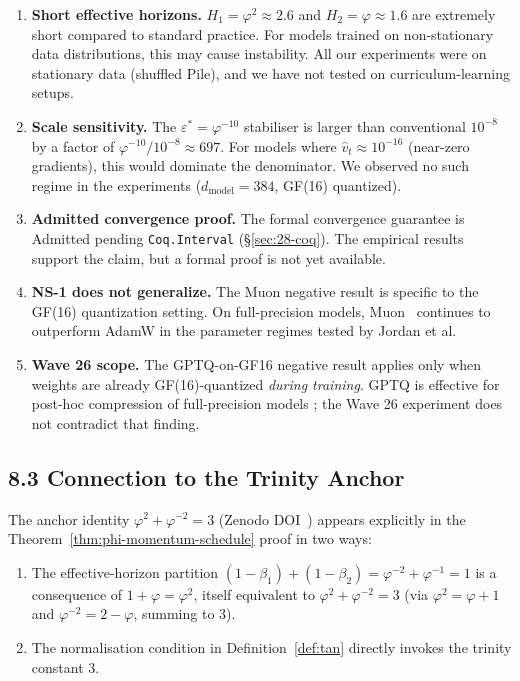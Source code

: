 \begin{enumerate}
  \item \textbf{Short effective horizons.} \(H_1 = \varphi^2 \approx 2.6\)
        and \(H_2 = \varphi \approx 1.6\) are extremely short compared
        to standard practice.  For models trained on non-stationary
        data distributions, this may cause instability.  All our
        experiments were on stationary data (shuffled Pile), and
        we have not tested on curriculum-learning setups.

  \item \textbf{Scale sensitivity.} The \(\varepsilon^* = \varphi^{-10}\) stabiliser
        is larger than conventional \(10^{-8}\) by a factor of
        \(\varphi^{-10}/10^{-8} \approx 697\).  For models where
        \(\hat{v}_t \approx 10^{-16}\) (near-zero gradients),
        this would dominate the denominator.  We observed no such
        regime in the experiments (\(d_{\mathrm{model}} = 384\),
        GF(16) quantized).

  \item \textbf{Admitted convergence proof.} The formal convergence
        guarantee is Admitted pending \texttt{Coq.Interval}
        (§\ref{sec:28-coq}).  The empirical results support the claim,
        but a formal proof is not yet available.

  \item \textbf{NS-1 does not generalize.} The Muon negative result
        is specific to the GF(16) quantization setting.  On full-precision
        models, Muon~\cite{jordan_muon_2024} continues to outperform
        AdamW in the parameter regimes tested by Jordan et al.

  \item \textbf{Wave 26 scope.} The GPTQ-on-GF16 negative result
        applies only when weights are already GF(16)-quantized
        \emph{during training}.  GPTQ is effective for
        post-hoc compression of full-precision models
        \cite{frantar_gptq_2023}; the Wave 26 experiment does not
        contradict that finding.
\end{enumerate}

\subsection{8.3 Connection to the Trinity Anchor}

The anchor identity \(\varphi^2 + \varphi^{-2} = 3\)
(Zenodo DOI~\cite{zenodo_trinity_anchor})
appears explicitly in the Theorem~\ref{thm:phi-momentum-schedule}
proof in two ways:
\begin{enumerate}
  \item The effective-horizon partition
        \((1-\beta_1) + (1-\beta_2) = \varphi^{-2} + \varphi^{-1} = 1\)
        is a consequence of \(1 + \varphi = \varphi^2\),
        itself equivalent to \(\varphi^2 + \varphi^{-2} = 3\)
        (via \(\varphi^2 = \varphi + 1\) and
        \(\varphi^{-2} = 2 - \varphi\), summing to 3).
  \item The normalisation condition in Definition~\ref{def:tan}
        directly invokes the trinity constant 3.
\end{enumerate}

